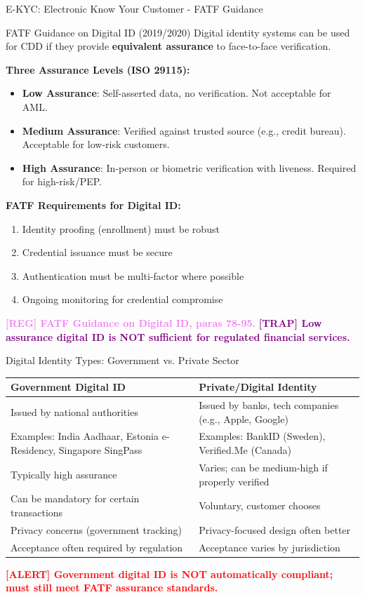 \documentclass[11pt,a4paper]{beamer}
\newcommand{\redflag}[1]{\textcolor{red}{\textbf{[ALERT] #1}}}
\newcommand{\trap}[1]{\textcolor{purple}{\textbf{[TRAP] #1}}}
\newcommand{\regcite}[1]{\textcolor{violet}{\textbf{[REG] #1}}}
\begin{document}
\begin{frame}{E-KYC: Electronic Know Your Customer - FATF Guidance}
	\begin{block}{FATF Guidance on Digital ID (2019/2020)}
		Digital identity systems can be used for CDD if they provide \textbf{equivalent assurance} to face-to-face verification.
	\end{block}
	\textbf{Three Assurance Levels (ISO 29115):}
	\begin{itemize}
		\item \textbf{Low Assurance}: Self-asserted data, no verification. Not acceptable for AML.
		\item \textbf{Medium Assurance}: Verified against trusted source (e.g., credit bureau). Acceptable for low-risk customers.
		\item \textbf{High Assurance}: In-person or biometric verification with liveness. Required for high-risk/PEP.
	\end{itemize}
	\textbf{FATF Requirements for Digital ID:}
	\begin{enumerate}
		\item Identity proofing (enrollment) must be robust
		\item Credential issuance must be secure
		\item Authentication must be multi-factor where possible
		\item Ongoing monitoring for credential compromise
	\end{enumerate}
	\regcite{FATF Guidance on Digital ID, paras 78-95.}
	\trap{Low assurance digital ID is NOT sufficient for regulated financial services.}
\end{frame}

\begin{frame}{Digital Identity Types: Government vs. Private Sector}
	\begin{tabular}{p{}|p{}}
		\hline
		\rowcolor{lightgray}
		\textbf{Government Digital ID} & \textbf{Private/Digital Identity} \\
		\hline
		Issued by national authorities & Issued by banks, tech companies (e.g., Apple, Google) \\
		\hline
		Examples: India Aadhaar, Estonia e-Residency, Singapore SingPass & Examples: BankID (Sweden), Verified.Me (Canada) \\
		\hline
		Typically high assurance & Varies; can be medium-high if properly verified \\
		\hline
		Can be mandatory for certain transactions & Voluntary, customer chooses \\
		\hline
		Privacy concerns (government tracking) & Privacy-focused design often better \\
		\hline
		Acceptance often required by regulation & Acceptance varies by jurisdiction \\
		\hline
	\end{tabular}
	\redflag{Government digital ID is NOT automatically compliant; must still meet FATF assurance standards.}
\end{frame}
\end{document}
